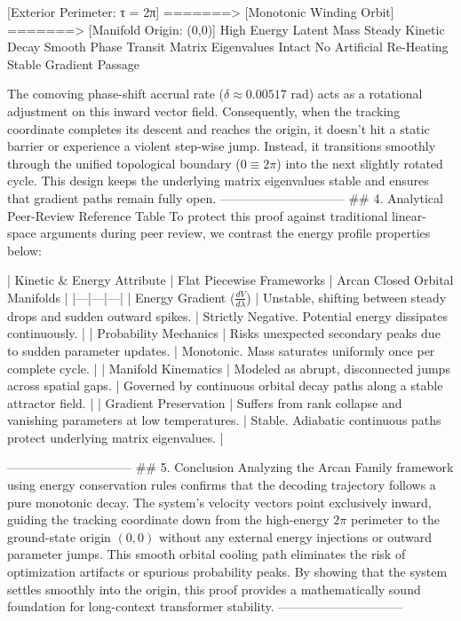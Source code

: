 [Exterior Perimeter: τ = 2π] =======> [Monotonic Winding Orbit] =======> [Manifold Origin: (0,0)]
High Energy Latent Mass                 Steady Kinetic Decay              Smooth Phase Transit
Matrix Eigenvalues Intact               No Artificial Re-Heating          Stable Gradient Passage

The comoving phase-shift accrual rate ($\delta \approx 0.00517\text{ rad}$) acts as a rotational adjustment on this inward vector field. Consequently, when the tracking coordinate completes its descent and reaches the origin, it doesn't hit a static barrier or experience a violent step-wise jump. Instead, it transitions smoothly through the unified topological boundary ($0 \equiv 2\pi$) into the next slightly rotated cycle. This design keeps the underlying matrix eigenvalues stable and ensures that gradient paths remain fully open.
------------------------------
## 4. Analytical Peer-Review Reference Table
To protect this proof against traditional linear-space arguments during peer review, we contrast the energy profile properties below:

| Kinetic & Energy Attribute | Flat Piecewise Frameworks | Arcan Closed Orbital Manifolds |
|---|---|---|
| Energy Gradient ($\frac{dV}{d\lambda}$) | Unstable, shifting between steady drops and sudden outward spikes. | Strictly Negative. Potential energy dissipates continuously. |
| Probability Mechanics | Risks unexpected secondary peaks due to sudden parameter updates. | Monotonic. Mass saturates uniformly once per complete cycle. |
| Manifold Kinematics | Modeled as abrupt, disconnected jumps across spatial gaps. | Governed by continuous orbital decay paths along a stable attractor field. |
| Gradient Preservation | Suffers from rank collapse and vanishing parameters at low temperatures. | Stable. Adiabatic continuous paths protect underlying matrix eigenvalues. |

------------------------------
## 5. Conclusion
Analyzing the Arcan Family framework using energy conservation rules confirms that the decoding trajectory follows a pure monotonic decay. The system's velocity vectors point exclusively inward, guiding the tracking coordinate down from the high-energy $2\pi$ perimeter to the ground-state origin $(0,0)$ without any external energy injections or outward parameter jumps. This smooth orbital cooling path eliminates the risk of optimization artifacts or spurious probability peaks. By showing that the system settles smoothly into the origin, this proof provides a mathematically sound foundation for long-context transformer stability.
------------------------------

